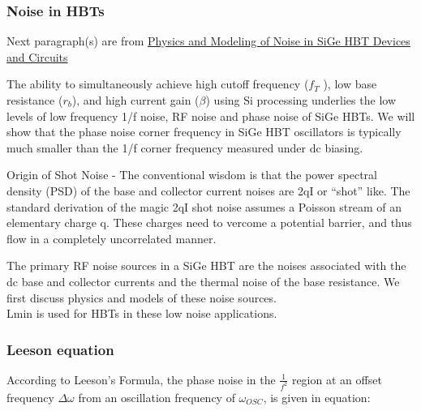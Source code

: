 \subsubsection*{Noise in HBTs}

Next paragraph(s) are from \href{https://briefs.techconnect.org/wp-content/volumes/Nanotech2005WCM/pdf/1244.pdf}{Physics and Modeling of Noise in SiGe HBT Devices and Circuits}

The ability to simultaneously achieve high cutoff frequency ($f_T$ ), low base resistance ($r_b$), and high current gain ($\beta$) using Si processing underlies the low levels of low frequency 1/f noise, RF noise and phase noise of SiGe HBTs. We will show that the phase noise corner frequency in SiGe HBT oscillators is typically much smaller than the 1/f corner frequency measured under dc biasing.

Origin of Shot Noise - The conventional wisdom is that the power spectral density (PSD) of the base and collector current noises are 2qI or “shot” like. The standard derivation of the magic 2qI shot noise assumes a Poisson stream of an elementary charge q. These charges need to  vercome a potential barrier, and thus flow in a completely uncorrelated manner.

The primary RF noise sources in a SiGe HBT are the noises associated with the dc base and collector currents and the thermal noise of the base resistance. We first discuss physics and models of these noise sources. \\

Lmin is used for HBTs in these low noise applications. 



\subsubsection*{Leeson equation}

According to Leeson's Formula, the phase noise in the $\frac{1}{f^2}$ region at an offset frequency $\Delta \omega$ from an oscillation frequency of $\omega_{OSC}$, is given in equation:

